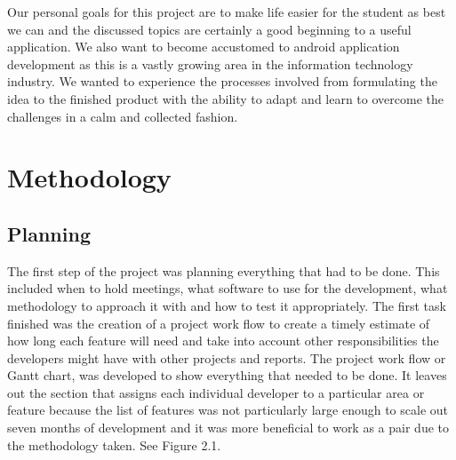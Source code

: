 Our personal goals for this project are to make life easier for the student as best we can and the discussed topics are certainly a good beginning to a useful application. We also want to become accustomed to android application development as this is a vastly growing area in the information technology industry. We wanted to experience the processes involved from formulating the idea to the finished product with the ability to adapt and learn to overcome the challenges in a calm and collected fashion.

\chapter{Methodology}
\section{Planning}
The first step of the project was planning everything that had to be done. This included when to hold meetings, what software to use for the development, what methodology to approach it with and how to test it appropriately. The first task finished was the creation of a project work flow to create a timely estimate of how long each feature will need and take into account other responsibilities the developers might have with other projects and reports. The project work flow or Gantt chart, was developed to show everything that needed to be done. It leaves out the section that assigns each individual developer to a particular area or feature because the list of features was not particularly large enough to scale out seven months of development and it was more beneficial to work as a pair due to the methodology taken. See Figure 2.1.

